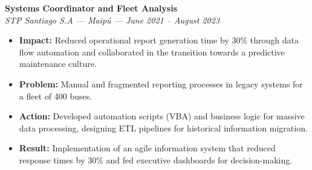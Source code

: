 \documentclass[10pt,letterpaper]{article}
\begin{document}
\noindent \textbf{Systems Coordinator and Fleet Analysis} \\
\textit{STP Santiago S.A — Maipú — June 2021 – August 2023}
\begin{itemize}
    \item \textbf{Impact:} Reduced operational report generation time by 30\% through data flow automation and collaborated in the transition towards a predictive maintenance culture.
    \item \textbf{Problem:} Manual and fragmented reporting processes in legacy systems for a fleet of 400 buses.
    \item \textbf{Action:} Developed automation scripts (VBA) and business logic for massive data processing, designing ETL pipelines for historical information migration.
    \item \textbf{Result:} Implementation of an agile information system that reduced response times by 30\% and fed executive dashboards for decision-making.
\end{itemize}

\vspace{0.2cm}



\vspace{0.4cm}
\vspace{0.3cm}
\end{document}
